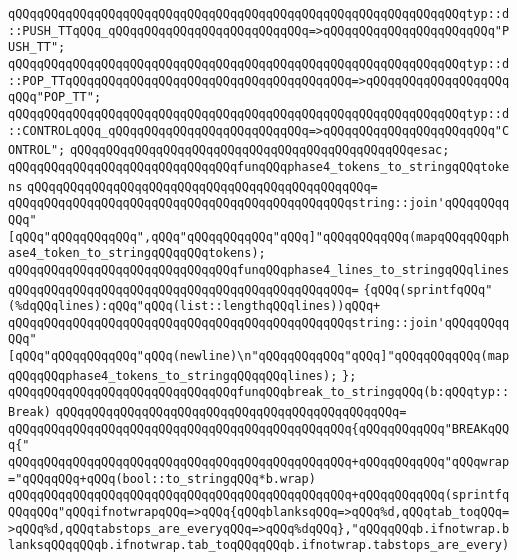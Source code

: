 \verb|qQQqqQQqqQQqqQQqqQQqqQQqqQQqqQQqqQQqqQQqqQQqqQQqqQQqqQQqqQQqqQQqtyp::d::PUSH_TTqQQq_qQQqqQQqqQQqqQQqqQQqqQQqqQQq=>qQQqqQQqqQQqqQQqqQQqqQQq"PUSH_TT";|\newline
\verb|qQQqqQQqqQQqqQQqqQQqqQQqqQQqqQQqqQQqqQQqqQQqqQQqqQQqqQQqqQQqqQQqtyp::d::POP_TTqQQqqQQqqQQqqQQqqQQqqQQqqQQqqQQqqQQqqQQq=>qQQqqQQqqQQqqQQqqQQqqQQq"POP_TT";|\newline
\verb|qQQqqQQqqQQqqQQqqQQqqQQqqQQqqQQqqQQqqQQqqQQqqQQqqQQqqQQqqQQqqQQqtyp::d::CONTROLqQQq_qQQqqQQqqQQqqQQqqQQqqQQqqQQq=>qQQqqQQqqQQqqQQqqQQqqQQq"CONTROL";|\newline
\verb|qQQqqQQqqQQqqQQqqQQqqQQqqQQqqQQqqQQqqQQqqQQqqQQqesac;|\newline
\newline
\verb|qQQqqQQqqQQqqQQqqQQqqQQqqQQqqQQqfunqQQqphase4_tokens_to_stringqQQqtokens|\newline
\verb|qQQqqQQqqQQqqQQqqQQqqQQqqQQqqQQqqQQqqQQqqQQqqQQq=|\newline
\verb|qQQqqQQqqQQqqQQqqQQqqQQqqQQqqQQqqQQqqQQqqQQqqQQqstring::join'qQQqqQQqqQQq"[qQQq"qQQqqQQqqQQq",qQQq"qQQqqQQqqQQq"qQQq]"qQQqqQQqqQQq(mapqQQqqQQqphase4_token_to_stringqQQqqQQqtokens);|\newline
\newline
\verb|qQQqqQQqqQQqqQQqqQQqqQQqqQQqqQQqfunqQQqphase4_lines_to_stringqQQqlines|\newline
\verb|qQQqqQQqqQQqqQQqqQQqqQQqqQQqqQQqqQQqqQQqqQQqqQQq=|\newline
\verb|{qQQq(sprintfqQQq"(%dqQQqlines):qQQq"qQQq(list::lengthqQQqlines))qQQq+|\newline
\verb|qQQqqQQqqQQqqQQqqQQqqQQqqQQqqQQqqQQqqQQqqQQqqQQqstring::join'qQQqqQQqqQQq"[qQQq"qQQqqQQqqQQq"qQQq(newline)\n"qQQqqQQqqQQq"qQQq]"qQQqqQQqqQQq(mapqQQqqQQqphase4_tokens_to_stringqQQqqQQqlines);|\newline
\verb|};|\newline
\newline
\verb|qQQqqQQqqQQqqQQqqQQqqQQqqQQqqQQqfunqQQqbreak_to_stringqQQq(b:qQQqtyp::Break)|\newline
\verb|qQQqqQQqqQQqqQQqqQQqqQQqqQQqqQQqqQQqqQQqqQQqqQQq=|\newline
\verb|qQQqqQQqqQQqqQQqqQQqqQQqqQQqqQQqqQQqqQQqqQQqqQQq{qQQqqQQqqQQq"BREAKqQQq{"|\newline
\verb|qQQqqQQqqQQqqQQqqQQqqQQqqQQqqQQqqQQqqQQqqQQqqQQq+qQQqqQQqqQQq"qQQqwrap="qQQqqQQq+qQQq(bool::to_stringqQQq*b.wrap)|\newline
\verb|qQQqqQQqqQQqqQQqqQQqqQQqqQQqqQQqqQQqqQQqqQQqqQQq+qQQqqQQqqQQq(sprintfqQQqqQQq"qQQqifnotwrapqQQq=>qQQq{qQQqblanksqQQq=>qQQq%d,qQQqtab_toqQQq=>qQQq%d,qQQqtabstops_are_everyqQQq=>qQQq%dqQQq},"qQQqqQQqb.ifnotwrap.blanksqQQqqQQqb.ifnotwrap.tab_toqQQqqQQqb.ifnotwrap.tabstops_are_every)|\newline
